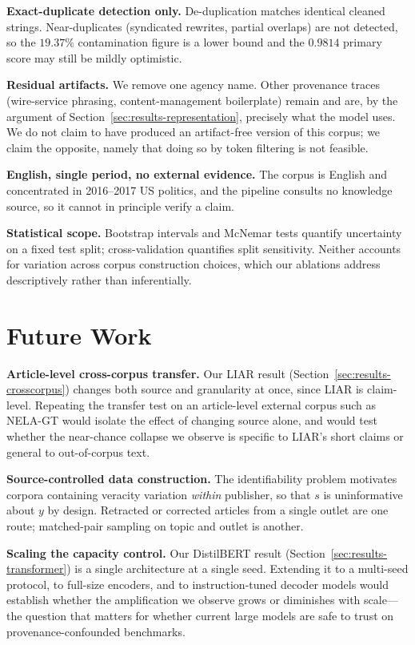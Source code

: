 \documentclass[conference]{IEEEtran}
\begin{document}
\textbf{Exact-duplicate detection only.} De-duplication matches identical
cleaned strings. Near-duplicates (syndicated rewrites, partial overlaps) are
not detected, so the $19.37\%$ contamination figure is a lower bound and the
$0.9814$ primary score may still be mildly optimistic.

\textbf{Residual artifacts.} We remove one agency name. Other provenance traces
(wire-service phrasing, content-management boilerplate) remain and are, by the
argument of Section~\ref{sec:results-representation}, precisely what the model
uses. We do not claim to have produced an artifact-free version of this corpus;
we claim the opposite, namely that doing so by token filtering is not feasible.

\textbf{English, single period, no external evidence.} The corpus is English
and concentrated in 2016--2017 US politics, and the pipeline consults no
knowledge source, so it cannot in principle verify a claim.

\textbf{Statistical scope.} Bootstrap intervals and McNemar tests quantify
uncertainty on a fixed test split; cross-validation quantifies split
sensitivity. Neither accounts for variation across corpus construction choices,
which our ablations address descriptively rather than inferentially.

\section{Future Work}
\label{sec:futurework}

\textbf{Article-level cross-corpus transfer.} Our LIAR result
(Section~\ref{sec:results-crosscorpus}) changes both source and granularity at
once, since LIAR is claim-level. Repeating the transfer test on an article-level
external corpus such as NELA-GT \cite{norregaard2019nela} would isolate the
effect of changing source alone, and would test whether the near-chance collapse
we observe is specific to LIAR's short claims or general to out-of-corpus text.

\textbf{Source-controlled data construction.} The identifiability problem
motivates corpora containing veracity variation \emph{within} publisher, so
that $s$ is uninformative about $y$ by design. Retracted or corrected articles
from a single outlet are one route; matched-pair sampling on topic and outlet is
another.

\textbf{Scaling the capacity control.} Our DistilBERT result
(Section~\ref{sec:results-transformer}) is a single architecture at a single
seed. Extending it to a multi-seed protocol, to full-size encoders, and to
instruction-tuned decoder models would establish whether the amplification we
observe grows or diminishes with scale---the question that matters for whether
current large models are safe to trust on provenance-confounded benchmarks.
\end{document}
